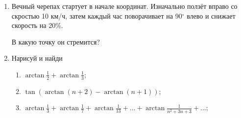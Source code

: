 \documentclass[12pt]{article}
\theoremstyle{definition}
\begin{document}
{\begin{enumerate}
  Какой путь черепаха пройдет за свою бесконечную жизнь?

  \item Вечный черепах стартует в начале координат. 
  Изначально ползёт вправо со скростью 10 км/ч, затем каждый час поворачивает на 90$^{\circ}$ влево 
  и снижает скорость на 20\%.
  
  В какую точку он стремится?
  
  \item Нарисуй и найди 
  
  \begin{minipage}{\linewidth}
    \begin{multicols}{2}
      \begin{enumerate}    
      \item $\arctan \frac{1}{2} + \arctan \frac{1}{3}$;
      \item $\tan(\arctan (n + 2) - \arctan (n+1))$;
      \item $\arctan \frac{1}{3} + \arctan \frac{1}{7} + \arctan \frac{1}{13} + \ldots +\arctan \frac{1}{n^2 + 3n + 3} + \ldots$;
    \end{enumerate}
  \end{multicols}
  \end{minipage}
  
\end{enumerate}
}
\end{document}
